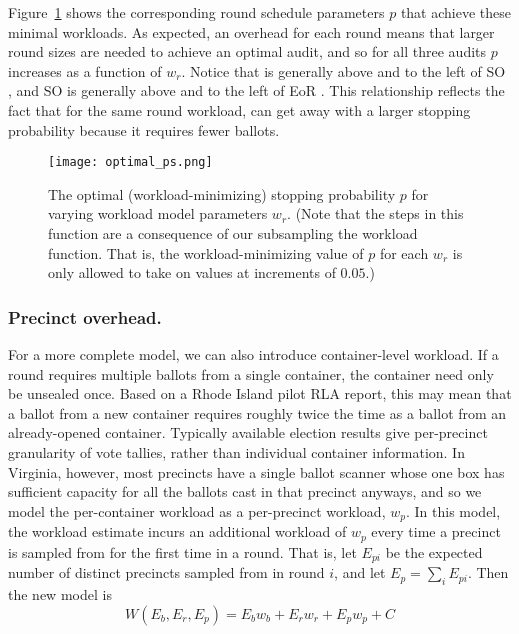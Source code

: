 Figure~\ref{fig:optimal_ps} shows the corresponding round schedule parameters $p$ that achieve these minimal workloads. As expected, an overhead for each round means that larger round sizes are needed to achieve an optimal audit, and so for all three audits $p$ increases as a function of $w_r$. Notice that \Providence is generally above and to the left of SO \BRAVO, and SO \BRAVO is generally above and to the left of EoR \BRAVO. This relationship reflects the fact that for the same round workload, \Providence can get away with a larger stopping probability because it requires fewer ballots.
\begin{figure}[h!]
\texttt{[image: optimal\_ps.png]}
\caption{The optimal (workload-minimizing) stopping probability $p$ for varying workload model parameters $w_r$. (Note that the steps in this function are a consequence of our subsampling the workload function. That is, the workload-minimizing value of $p$ for each $w_r$ is only allowed to take on values at increments of $0.05$.)}
\label{fig:optimal_ps}
\end{figure}

\subsubsection{Precinct overhead.} For a more complete model, we can also introduce container-level workload. If a round requires multiple ballots from a single container, the container need only be unsealed once. Based on a Rhode Island pilot RLA report\cite{RI-report}, this may mean that a ballot from a new container requires roughly twice the time as a ballot from an already-opened container. Typically available election results give per-precinct granularity of vote tallies, rather than individual container information. In Virginia, however, most precincts have a single ballot scanner whose one box has sufficient capacity for all the ballots cast in that precinct anyways, and so we model the per-container workload as a per-precinct workload, $w_p$. In this model, the workload estimate incurs an additional workload of $w_p$ every time a precinct is sampled from for the first time in a round. That is, let $E_{pi}$ be the expected number of distinct precincts sampled from in round $i$, and let $E_p=\sum_i E_{pi}$. Then the new model is
\begin{equation}
W(E_b, E_r, E_p) = E_b w_b + E_r w_r + E_p w_p + C
\label{eq:round_and_precinct_workload}
\end{equation}

